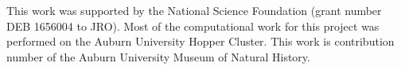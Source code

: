 This work was supported by the National Science Foundation (grant number DEB
1656004 to JRO).
Most of the computational work for this project was performed on the
Auburn University Hopper Cluster.
This work is contribution number  of the Auburn University
Museum of Natural History.

